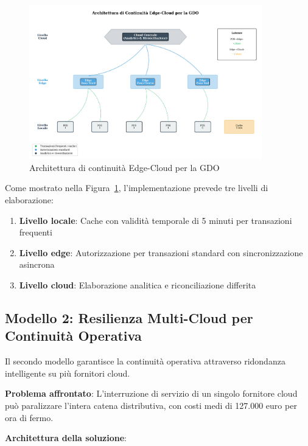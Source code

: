 \begin{figure}[htbp]
\centering
\includegraphics[width=0.9\textwidth]{thesis_figures/cap4/fig_3_1_edge_cloud_architecture.pdf}
\caption{Architettura di continuità Edge-Cloud per la GDO}
\label{fig:edge-cloud}
\end{figure}

Come mostrato nella Figura~\ref{fig:edge-cloud}, l'implementazione prevede tre livelli di elaborazione:
\begin{enumerate}
    \item \textbf{Livello locale}: Cache con validità temporale di 5 minuti per transazioni frequenti
    \item \textbf{Livello edge}: Autorizzazione per transazioni standard con sincronizzazione asincrona  
    \item \textbf{Livello cloud}: Elaborazione analitica e riconciliazione differita
\end{enumerate}

\subsection{\texorpdfstring{Modello 2: Resilienza Multi-Cloud per Continuità Operativa}{3.2.2 - Modello 2: Resilienza Multi-Cloud per Continuità Operativa}}
\label{subsec:multi-cloud}

Il secondo modello garantisce la continuità operativa attraverso ridondanza intelligente su più fornitori cloud.

\textbf{Problema affrontato}: L'interruzione di servizio di un singolo fornitore cloud può paralizzare l'intera catena distributiva, con costi medi di 127.000 euro per ora di fermo\autocite{Uptime2024}.

\textbf{Architettura della soluzione}:

